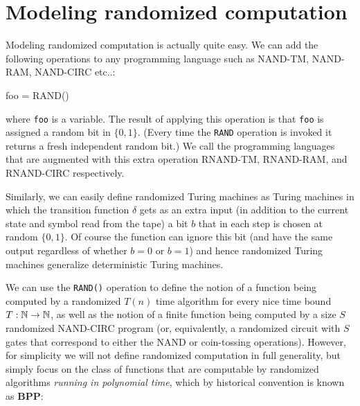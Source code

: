 \section{Modeling randomized
computation}\label{Modeling-randomized-compu}

Modeling randomized computation is actually quite easy. We can add the
following operations to any programming language such as NAND-TM,
NAND-RAM, NAND-CIRC etc..:

\begin{code}
foo = RAND()
\end{code}

where \texttt{foo} is a variable. The result of applying this operation
is that \texttt{foo} is assigned a random bit in \(\{0,1\}\). (Every
time the \texttt{RAND} operation is invoked it returns a fresh
independent random bit.) We call the programming languages that are
augmented with this extra operation RNAND-TM, RNAND-RAM, and RNAND-CIRC
respectively.

Similarly, we can easily define randomized Turing machines as Turing
machines in which the transition function \(\delta\) gets as an extra
input (in addition to the current state and symbol read from the tape) a
bit \(b\) that in each step is chosen at random \in \(\{0,1\}\). Of
course the function can ignore this bit (and have the same output
regardless of whether \(b=0\) or \(b=1\)) and hence randomized Turing
machines generalize deterministic Turing machines.

We can use the \texttt{RAND()} operation to define the notion of a
function being computed by a randomized \(T(n)\) time algorithm for
every nice time bound \(T:{\mathbb{N}} \rightarrow {\mathbb{N}}\), as well as the notion of
a finite function being computed by a size \(S\) randomized NAND-CIRC
program (or, equivalently, a randomized circuit with \(S\) gates that
correspond to either the NAND or coin-tossing operations). However, for
simplicity we will not define randomized computation in full generality,
but simply focus on the class of functions that are computable by
randomized algorithms \emph{running in polynomial time}, which by
historical convention is known as \(\mathbf{BPP}\):

\hypertarget{BPPdef}{}

